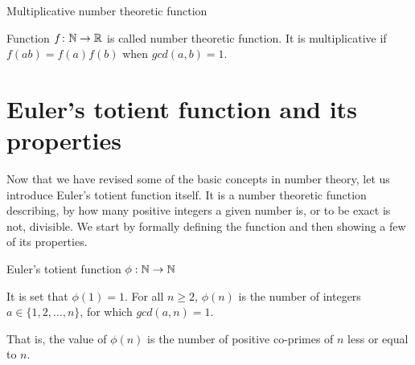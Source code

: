 \documentclass{article}
\begin{document}
\begin{definition}
Multiplicative number theoretic function

Function $f\colon \mathbb{N} \rightarrow \mathbb{R}$ is called number theoretic function. It is multiplicative if $f(ab) = f(a)f(b)$ when $gcd(a, b)=1$.

\end{definition}

\section{Euler's totient function and its properties}

Now that we have revised some of the basic concepts in number theory, let us introduce Euler's totient function itself. It is a number theoretic function describing, by how many positive integers a given number is, or to be exact is not, divisible. We start by formally defining the function and then showing a few of its properties.

\begin{definition}
Euler's totient function $\phi: \mathbb{N} \rightarrow \mathbb{N}$

It is set that $\phi(1) = 1$. For all $n \geq 2$, $\phi(n)$ is the number of integers $a \in \{1,2,\dots,n\}$, for which $gcd(a,n) = 1$.

\end{definition}


That is, the value of $\phi(n)$ is the number of positive co-primes of $n$ less or equal to $n$.
\end{document}
